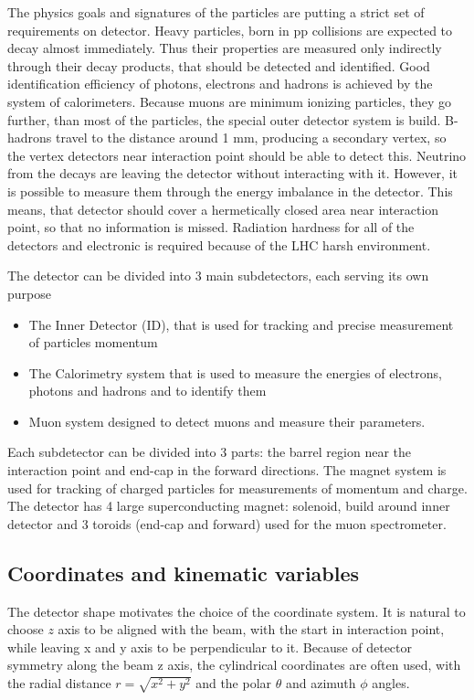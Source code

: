 The physics goals and signatures of the particles are putting a strict set of requirements on \atlas detector. Heavy particles, born in pp collisions are expected to decay almost immediately. Thus their properties are measured only indirectly through their decay products, that should be detected and identified.  Good identification efficiency of photons, electrons and hadrons is achieved by the system of calorimeters. Because muons are minimum ionizing particles, they go further, than most of the particles, the special outer detector system is build. B-hadrons travel to the distance around 1 mm, producing a secondary vertex, so the vertex detectors near interaction point should be able to detect this. Neutrino from the decays are leaving the detector without interacting with it. However, it is possible to measure them through the energy imbalance in the detector. This means, that detector should cover a hermetically closed area near interaction point, so that no information is missed.  Radiation hardness for all of the detectors and electronic is required because of the LHC harsh environment. 

The \atlas detector can be divided into 3 main subdetectors, each serving its own purpose
\begin{itemize}
\item The Inner Detector (ID), that is used for tracking and precise measurement of particles momentum
\item The Calorimetry system that is used to measure the energies of electrons, photons and hadrons and to identify them
\item Muon system designed to detect muons and measure their parameters.
\end{itemize}

Each subdetector can be divided into 3 parts: the barrel region near the interaction point and end-cap in the forward directions.  The magnet system is used for tracking of charged particles for measurements of momentum and charge. The \atlas detector has 4 large superconducting magnet: solenoid, build around inner detector and 3 toroids (end-cap and forward) used for the muon spectrometer. 

\subsection{Coordinates and kinematic variables}
The detector shape motivates the choice of the coordinate system. It is natural to choose $z$ axis to be aligned with the beam, with the start in interaction point, while leaving x and y axis to be perpendicular to it. Because of detector symmetry along the beam z axis, the cylindrical coordinates are often used, with the radial distance $r=\sqrt{x^2+y^2}$ and the polar $\theta$ and azimuth $\phi$ angles.  

